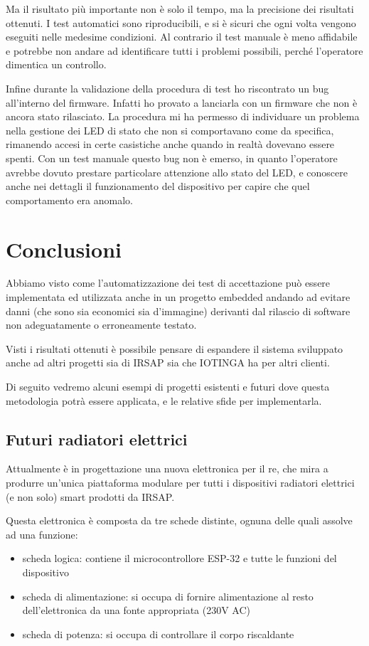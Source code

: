 \documentclass[12pt,a4paper,twoside,titlepage]{book}
\begin{document}
Ma il risultato più importante non è solo il tempo, ma la precisione dei risultati ottenuti. I test automatici 
sono riproducibili, e si è sicuri che ogni volta vengono eseguiti nelle medesime condizioni. Al contrario il 
test manuale è meno affidabile e potrebbe non andare ad identificare tutti i problemi possibili, perché l'operatore 
dimentica un controllo. 

Infine durante la validazione della procedura di test ho riscontrato un bug all'interno del firmware. 
Infatti ho provato a lanciarla con un firmware che non è ancora stato rilasciato. La procedura mi ha permesso di 
individuare un problema nella gestione dei LED di stato che non si comportavano come da specifica, rimanendo 
accesi in certe casistiche anche quando in realtà dovevano essere spenti. Con un test manuale questo bug non è 
emerso, in quanto l'operatore avrebbe dovuto prestare particolare attenzione allo stato del LED, e conoscere 
anche nei dettagli il funzionamento del dispositivo per capire che quel comportamento era anomalo. 

\chapter{Conclusioni}

Abbiamo visto come l'automatizzazione dei test di accettazione può essere implementata
ed utilizzata anche in un progetto embedded andando ad evitare danni (che sono sia economici
sia d'immagine) derivanti dal rilascio di software non adeguatamente o erroneamente testato.

Visti i risultati ottenuti è possibile pensare di espandere il sistema sviluppato
anche ad altri progetti sia di IRSAP sia che IOTINGA ha per altri clienti.

Di seguito vedremo alcuni esempi di progetti esistenti e futuri dove questa metodologia
potrà essere applicata, e le relative sfide per implementarla.

\section{Futuri radiatori elettrici}

Attualmente è in progettazione una nuova elettronica per il \acrshort{re},
che mira a produrre un'unica piattaforma modulare per tutti i dispositivi radiatori elettrici
(e non solo) smart prodotti da IRSAP.

Questa elettronica è composta da tre schede distinte, ognuna delle quali assolve
ad una funzione:
\begin{itemize}
    \item scheda logica: contiene il microcontrollore ESP-32 e tutte le funzioni del dispositivo
    \item scheda di alimentazione: si occupa di fornire alimentazione al resto dell'elettronica
        da una fonte appropriata (230V AC)
    \item scheda di potenza: si occupa di controllare il corpo riscaldante
\end{itemize}
\end{document}
